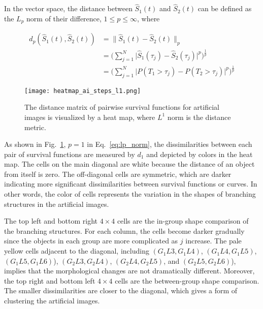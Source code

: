       In the vector space, the distance between $\widehat S_1(t)$ and
      $\widehat S_2(t)$ can be defined as the $L_p$ norm of their
      difference, $ 1 \leq p \leq \infty$, where

      \begin{equation}\label{eq:lp_norm}
        \begin{split}
          d_p(\widehat S_1(t), \widehat S_2(t))&= \lVert \widehat S_1(t) - \widehat S_2(t) \rVert_{p} \\
          &= \Big(\sum^{N}_{j=1} \lvert \widehat S_1(\tau_j) - \widehat S_2(\tau_j)\rvert^p\Big)^{\frac{1}{p}} \\
          &= \Big(\sum^{N}_{j=1} \lvert P({T_1 > \tau_j}) - P({T_2 > \tau_j}) \rvert^p\Big)^{\frac{1}{p}}
        \end{split}
      \end{equation}
      
      
      \begin{figure}
        \centering
        \texttt{[image: heatmap\_ai\_steps\_l1.png]}
        \caption{The distance matrix of pairwise survival functions
          for artificial images is visualized by a heat map, where
          $L^1$ norm is the distance metric.}
        \label{fig:heatmap_ai_steps_l1}
      \end{figure}


      As shown in Fig.~\ref{fig:heatmap_ai_steps_l1}, $p=1$ in
      Eq.~\ref{eq:lp_norm}, the dissimilarities between each pair of
      survival functions are measured by $d_1$ and depicted by colors
      in the heat map. The cells on the main diagonal are white
      because the distance of an object from itself is zero. The
      off-diagonal cells are symmetric, which are darker indicating
      more significant dissimilarities between survival functions or
      curves. In other words, the color of cells represents the
      variation in the shapes of branching structures in the
      artificial images.


      The top left and bottom right $4 \times 4$ cells are the
      in-group shape comparison of the branching structures. For each
      column, the cells become darker gradually since the objects in
      each group are more complicated as $j$ increase. The pale yellow
      cells adjacent to the diagonal, including $(G_1L3, G_1L4)$,
      $(G_1L4, G_1L5)$, $(G_1L5, G_1L6)$), $(G_2L3, G_2L4)$, $(G_2L4,
      G_2L5)$, and $(G_2L5, G_2L6)$), implies that the morphological
      changes are not dramatically different. Moreover, the top right
      and bottom left $4 \times 4$ cells are the between-group shape
      comparison. The smaller dissimilarities are closer to the
      diagonal, which gives a form of clustering the artificial
      images.

